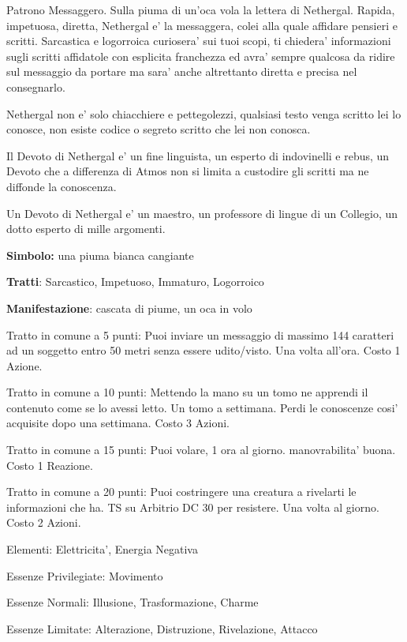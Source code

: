\documentclass[a4paper,11pt,twoside,openany]{book}
\begin{document}
{\label{nethergal}

Patrono Messaggero. Sulla piuma di un'oca vola la lettera di Nethergal. Rapida, impetuosa, diretta, Nethergal e' la messaggera, colei alla quale affidare pensieri e scritti. Sarcastica e logorroica curiosera' sui tuoi scopi, ti chiedera' informazioni sugli scritti affidatole con esplicita franchezza ed avra' sempre qualcosa da ridire sul messaggio da portare ma sara' anche altrettanto diretta e precisa nel consegnarlo. 

Nethergal non e' solo chiacchiere e pettegolezzi, qualsiasi testo venga scritto lei lo conosce, non esiste codice o segreto scritto che lei non conosca.

Il Devoto di Nethergal e' un fine linguista, un esperto di indovinelli e rebus, un Devoto che a differenza di Atmos non si limita a custodire gli scritti ma ne diffonde la conoscenza.

Un Devoto di Nethergal e' un maestro, un professore di lingue di un Collegio, un dotto esperto di mille argomenti.

\textbf{Simbolo:} una piuma bianca cangiante

\textbf{Tratti}: Sarcastico, Impetuoso, Immaturo, Logorroico

\textbf{Manifestazione}: cascata di piume, un oca in volo

\bigskip

Tratto in comune a 5 punti: Puoi inviare un messaggio di massimo 144 caratteri ad un soggetto entro 50 metri senza essere udito/visto. Una volta all'ora. Costo 1 Azione.

Tratto in comune a 10 punti: Mettendo la mano su un tomo ne apprendi il contenuto come se lo avessi letto. Un tomo a settimana. Perdi le conoscenze cosi' acquisite dopo una settimana. Costo 3 Azioni.

Tratto in comune a 15 punti: Puoi volare, 1 ora al giorno. manovrabilita' buona. Costo 1 Reazione.

Tratto in comune a 20 punti: Puoi costringere una creatura a rivelarti le informazioni che ha. TS su Arbitrio DC 30 per resistere. Una volta al giorno. Costo 2 Azioni.

\bigskip

Elementi: Elettricita', Energia Negativa

\bigskip

Essenze Privilegiate: Movimento

Essenze Normali: Illusione, Trasformazione, Charme

Essenze Limitate: Alterazione, Distruzione, Rivelazione, Attacco

}
\end{document}
